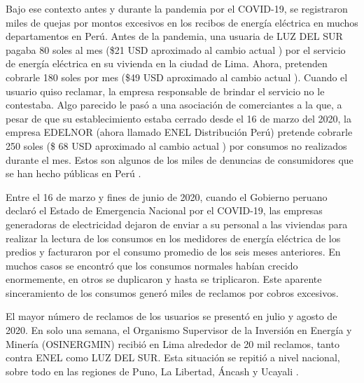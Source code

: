 Bajo ese contexto antes y durante la pandemia por el COVID-19, se registraron miles de quejas por montos excesivos en los recibos de energía eléctrica en muchos departamentos en Perú. Antes de la pandemia, una usuaria de LUZ DEL SUR \citep{WEBSITE:32} pagaba 80 soles al mes (\$21 USD aproximado al cambio actual \citep{WEBSITE:43}) por el servicio de energía eléctrica en su vivienda en la ciudad de Lima. Ahora, pretenden cobrarle 180 soles por mes (\$49 USD aproximado al cambio actual \citep{WEBSITE:43}). Cuando el usuario quiso reclamar, la empresa responsable de brindar el servicio no le contestaba. Algo parecido le pasó a una asociación de comerciantes a la que, a pesar de que su establecimiento estaba cerrado desde el 16 de marzo del 2020, la empresa EDELNOR (ahora llamado ENEL Distribución Perú) \citep{WEBSITE:33} \citep{WEBSITE:34} pretende cobrarle 250 soles (\$ 68 USD aproximado al cambio actual \citep{WEBSITE:43}) por consumos no realizados durante el mes. Estos son algunos de los miles de denuncias de consumidores que se han hecho públicas en Perú  \citep{WEBSITE:1}.

Entre el 16 de marzo y fines de junio de 2020, cuando el Gobierno peruano declaró el Estado de Emergencia Nacional por el COVID-19, las empresas generadoras de electricidad dejaron de enviar a su personal a las viviendas para realizar la lectura de los consumos en los medidores de energía eléctrica de los predios y facturaron por el consumo promedio de los seis meses anteriores. En muchos casos se encontró que los consumos normales habían crecido enormemente, en otros se duplicaron y hasta se triplicaron. Este aparente sinceramiento de los consumos generó miles de reclamos por cobros excesivos. %

El mayor número de reclamos de los usuarios se presentó en julio y agosto de 2020. En solo una semana, el Organismo Supervisor de la Inversión en Energía y Minería (OSINERGMIN) recibió en Lima alrededor de 20 mil reclamos, tanto contra ENEL como LUZ DEL SUR. Esta situación se repitió a nivel nacional, sobre todo en las regiones de Puno, La Libertad, Áncash y Ucayali \citep{WEBSITE:1}.


